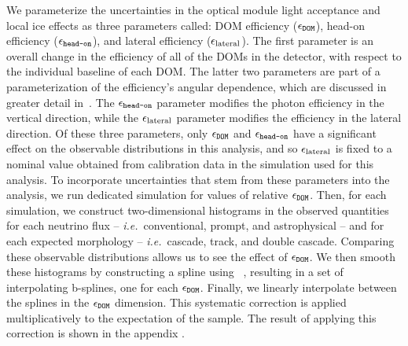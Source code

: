 We parameterize the uncertainties in the optical module light acceptance and local ice effects as three parameters called: DOM efficiency ($\epsilon_\texttt{DOM}$), head-on efficiency ($\epsilon_\texttt{head-on}$), and lateral efficiency ($\epsilon_\textmd{lateral}$).
The first parameter is an overall change in the efficiency of all of the DOMs in the detector, with respect to the individual baseline of each DOM.
The latter two parameters are part of a parameterization of the efficiency's angular dependence, which are discussed in greater detail in~\cite{Aartsen:2016nxy, Aartsen:2014yll, Aartsen:2017nmd}.
%
The $\epsilon_\texttt{head-on}$ parameter modifies the photon efficiency in the vertical direction, while the $\epsilon_\textmd{lateral}$ parameter modifies the efficiency in the lateral direction.
Of these three parameters, only $\epsilon_\texttt{DOM}$ and $\epsilon_\texttt{head-on}$ have a significant effect on the observable distributions in this analysis, and so $\epsilon_\textmd{lateral}$ is fixed to a nominal value obtained from calibration data in the simulation used for this analysis.
To incorporate uncertainties that stem from these parameters into the analysis, we run dedicated simulation for values of relative $\epsilon_\texttt{DOM}$.%
Then, for each simulation, we construct two-dimensional histograms in the observed quantities for each neutrino flux -- {\it{}i.e.}\ conventional, prompt, and astrophysical -- and for each expected morphology -- {\it{}i.e.}\ cascade, track, and double cascade.
Comparing these observable distributions allows us to see the effect of $\epsilon_\texttt{DOM}$.
We then smooth these histograms by constructing a spline using \PHOTOSPLINE~\cite{Whitehorn:2013nh,photospline}, resulting in a set of interpolating b-splines, one for each $\epsilon_\texttt{DOM}$.
Finally, we linearly interpolate between the splines in the $\epsilon_\texttt{DOM}$ dimension.
This systematic correction is applied multiplicatively to the expectation of the sample.
The result of applying this correction is shown in the appendix .

